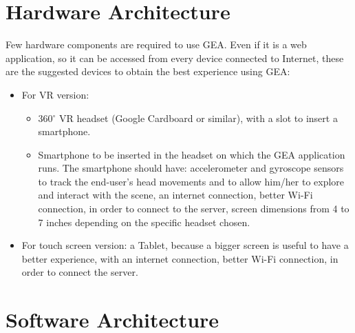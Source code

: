 \section{Hardware Architecture}
Few hardware components are required to use GEA. Even if it is a web application, so it can be accessed from every device connected to Internet, these are the suggested devices to obtain the best experience using GEA:
\begin{itemize}
\item For VR version:
\begin{itemize}
\item 360$^{\circ}$ VR headset (Google Cardboard or similar), with a slot to insert a smartphone.
\item Smartphone to be inserted in the headset on which the GEA application runs. The smartphone should have: accelerometer and gyroscope sensors to track the end-user's head movements and to allow him/her to explore and interact with the scene, an internet connection, better Wi-Fi connection, in order to connect to the server, screen dimensions from 4 to 7 inches depending on the specific headset chosen.
\end{itemize}
\item For touch screen version: a Tablet, because a bigger screen is useful to have a better experience, with an internet connection, better Wi-Fi connection, in order to connect the server.
\end{itemize}
\section{Software Architecture}